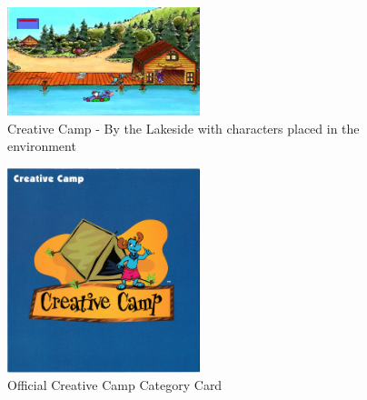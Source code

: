 \begin{figure}[H]
    \centering
    \includegraphics[width=0.5\textwidth]{"./Games/Creative/Images/CreativeCampScreenshot2.jpg"}
    \caption{Creative Camp - By the Lakeside with characters placed in the environment}
\end{figure}

\begin{figure}[H]
    \centering
    \includegraphics[width=0.5\textwidth]{"./Games/Creative/Images/CreativeCampOfficialCategoryCard.jpg"}
    \caption{Official Creative Camp Category Card}
\end{figure}